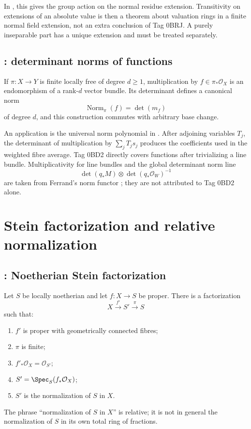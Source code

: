In , this gives the group action on
the normal residue extension. Transitivity on extensions of an absolute
value is then a theorem about valuation rings in a finite normal field
extension, not an extra conclusion of Tag 0BRJ. A purely inseparable part
has a unique extension and must be treated separately.

\subsection*{: determinant norms of functions}
\label{sec:stacks-tag-0BD2}

If \(\pi:X\to Y\) is finite locally free of degree \(d\geq1\), multiplication
by \(f\in\pi_*\mathcal O_X\) is an endomorphism of a rank-\(d\) vector
bundle. Its determinant defines a canonical norm
\[
                         \operatorname{Norm}_\pi(f)=\det(m_f)
\]
of degree \(d\), and this construction commutes with arbitrary base change.

An application is the universal norm polynomial in
. After adjoining variables \(T_j\),
the determinant of multiplication by \(\sum_jT_js_j\) produces the
coefficients used in the weighted fibre average. Tag 0BD2 directly covers
functions after trivializing a line bundle. Multiplicativity for line
bundles and the global determinant norm line
\[
       \det(q_*M)\otimes\det(q_*\mathcal O_W)^{-1}
\]
are taken from Ferrand's norm functor \cite{FerrandNorm}; they are not
attributed to Tag 0BD2 alone.

\section{Stein factorization and relative normalization}
\label{sec:stacks-stein}

\subsection*{: Noetherian Stein factorization}
\label{sec:stacks-tag-03H0}

Let \(S\) be locally noetherian and let \(f:X\to S\) be proper. There is a
factorization
\[
                         X\xrightarrow{f'}S'\xrightarrow{\pi}S
\]
such that:
\begin{enumerate}
\item \(f'\) is proper with geometrically connected fibres;
\item \(\pi\) is finite;
\item \(f'_*\mathcal O_X=\mathcal O_{S'}\);
\item \(S'=\Spec_S(f_*\mathcal O_X)\);
\item \(S'\) is the normalization of \(S\) in \(X\).
\end{enumerate}
The phrase “normalization of \(S\) in \(X\)” is relative; it is not in
general the normalization of \(S\) in its own total ring of fractions.

